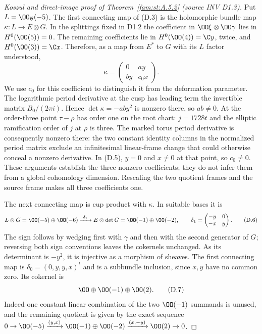 \begin{proof}[Koszul and direct-image proof of Theorem~\ref{fam:st:A.5.2} (source INV D1.3)]
Put $L=\OO_{\mathcal B}(-5)$. The first connecting map of (D.3) is
the holomorphic bundle map
$\kappa:L\to E\otimes G$. In the splittings fixed in D1.2 the
coefficient in $\OO\xi\otimes\OO\gamma$ lies in $H^0(\OO(5))=0$.
The remaining coefficients lie in
$H^0(\OO(4))=\C y$, twice, and $H^0(\OO(3))=\C x$.
Therefore, as a map from $E^*$ to $G$ with its $L$ factor understood,
\[
 \kappa=\begin{pmatrix}0&a y\\ b y&c_0x\end{pmatrix}. \tag{D.5}
\]
We use $c_0$ for this coefficient to distinguish it from the deformation
parameter. The logarithmic period derivative at the cusp has leading
term the invertible matrix $B_0/(2\pi i)$. Hence
$\det\kappa=-ab y^2$ is nonzero there, so $ab\ne0$.
At the order-three point $\tau-\rho$ has order one on the root chart:
$j=1728t$ and the elliptic ramification order of $j$ at $\rho$ is
three. The marked torus period derivative is consequently nonzero
there: the two constant identity columns in the normalized period
matrix exclude an infinitesimal linear-frame change that could
otherwise conceal a nonzero derivative. In (D.5), $y=0$ and
$x\ne0$ at that point, so $c_0\ne0$.
These arguments establish the three nonzero coefficients; they do not
infer them from a global cohomology dimension. Rescaling the two
quotient frames and the source frame makes all three coefficients one.

The next connecting map is cup product with $\kappa$. In suitable
bases it is
\[
 L\otimes G=\OO(-5)\oplus\OO(-6)
 \xrightarrow{\ \delta_1\ }
 E\otimes\det G=\OO(-1)\oplus\OO(-2),\qquad
 \delta_1=\begin{pmatrix}-y&0\\-x&y\end{pmatrix}.       \tag{D.6}
\]
The sign follows by wedging first with $\gamma$ and then with the
second generator of $G$; reversing both sign conventions leaves the
cokernels unchanged. As its determinant is $-y^2$, it is injective as
a morphism of sheaves. The first connecting map is
$\delta_0=(0,y,y,x)^t$ and is a subbundle inclusion, since $x,y$ have
no common zero. Its cokernel is
\[
 \OO\oplus\OO(-1)\oplus\OO(2).                       \tag{D.7}
\]
Indeed one constant linear combination of the two $\OO(-1)$ summands
is unused, and the remaining quotient is given by the exact sequence
$0\to\OO(-5)\xrightarrow{(y,x)}\OO(-1)\oplus\OO(-2)
\xrightarrow{(x,-y)}\OO(2)\to0$.


\end{proof}
